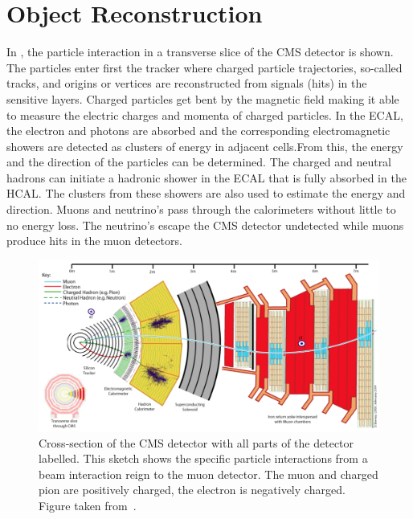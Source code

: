 \section{Object Reconstruction}
\label{sec:reco}
In , the particle interaction in a transverse slice of the CMS detector is shown. The particles enter first the tracker where charged particle trajectories, so-called tracks, and origins or vertices are reconstructed from signals (hits) in the sensitive layers. Charged particles get bent by the magnetic field making it able to measure the electric charges and momenta of charged particles. In the ECAL, the electron and photons are absorbed and the corresponding electromagnetic showers are detected as clusters of energy in adjacent  cells.From this, the energy and the direction of the particles can be determined. The charged and neutral hadrons can initiate a hadronic shower in the ECAL that is fully absorbed in the HCAL. The clusters from these showers are also used to estimate the energy and direction. Muons and neutrino's pass through the calorimeters without little to no energy loss. The neutrino's escape the CMS detector undetected while muons produce hits in the muon detectors. 
\begin{figure}
	\centering
	\includegraphics[width=1.\linewidth]{4_EventRecoSelect/Figures/transversecms}
	\caption{Cross-section of the CMS detector with all parts of the detector labelled. This sketch shows the specific particle interactions from a beam interaction reign to the muon detector. The muon and charged pion are positively charged, the electron is negatively charged. Figure taken from~\cite{CMS-PRF-14-001}. }
	\label{fig:transversecms}
\end{figure}

